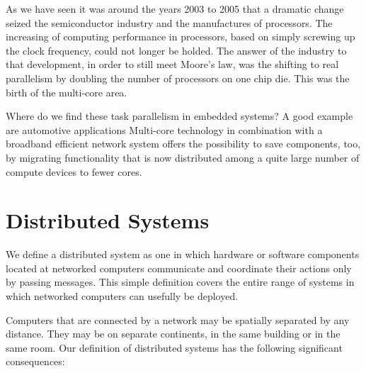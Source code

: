 As we have seen it was around the years 2003 to 2005 that a dramatic change
seized the semiconductor industry and the manufactures of processors. The
increasing of computing performance in processors, based on simply screwing up
the clock frequency, could not longer be holded. The answer of the industry to
that development, in order to still meet Moore’s law, was the shifting to real
parallelism by doubling the number of processors on one chip die. This was the
birth of the multi-core area. 

Where do we find these task parallelism in embedded systems? A good example are
automotive applications Multi-core technology in combination with a broadband
efficient network system offers the possibility to save components, too, by
migrating functionality that is now distributed among a quite large number of
compute devices to fewer cores.


\section{Distributed Systems}
\noindent

We define a distributed system as one in which hardware or software components
located at networked computers communicate and coordinate their actions only by
passing messages. This simple definition covers the entire range of systems in
which networked computers can usefully be deployed.

Computers that are connected by a network may be spatially separated by any
distance. They may be on separate continents, in the same building or in the
same room. Our definition of distributed systems has the following significant
consequences:



